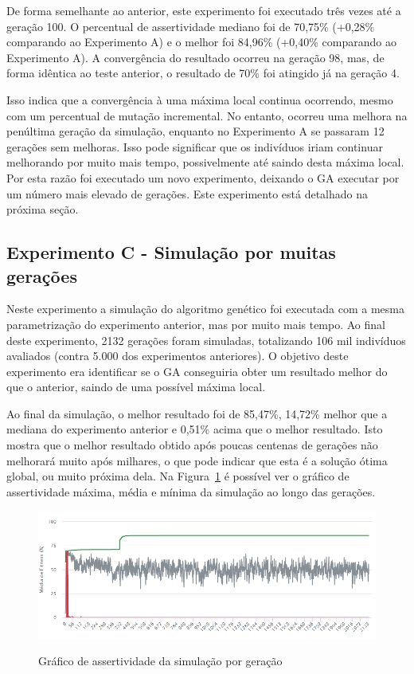 \documentclass[12pt,oneside,a4paper,english,french,spanish,brazil,]{abntex2}
\begin{document}
De forma semelhante ao anterior, este experimento foi executado três vezes até a geração 100. O percentual de assertividade mediano foi de 70,75\% (+0,28\% comparando ao Experimento A) e o melhor foi 84,96\% (+0,40\% comparando ao Experimento A). A convergência do resultado ocorreu na geração 98, mas, de forma idêntica ao teste anterior, o resultado de 70\% foi atingido já na geração 4. 

Isso indica que a convergência à uma máxima local continua ocorrendo, mesmo com um percentual de mutação incremental. No entanto, ocorreu uma melhora na penúltima geração da simulação, enquanto no Experimento A se passaram 12 gerações sem melhoras. Isso pode significar que os indivíduos iriam continuar melhorando por muito mais tempo, possivelmente até saindo desta máxima local. Por esta razão foi executado um novo experimento, deixando o GA executar por um número mais elevado de gerações. Este experimento está detalhado na próxima seção.


\subsection{Experimento C - Simulação por muitas gerações}

Neste experimento a simulação do algoritmo genético foi executada com a mesma parametrização do experimento anterior, mas por muito mais tempo. Ao final deste experimento, 2132 gerações foram simuladas, totalizando 106 mil indivíduos avaliados (contra 5.000 dos experimentos anteriores). O objetivo deste experimento era identificar se o GA conseguiria obter um resultado melhor do que o anterior, saindo de uma possível máxima local.

Ao final da simulação, o melhor resultado foi de 85,47\%, 14,72\% melhor que a mediana do experimento anterior e 0,51\% acima que o melhor resultado. Isto mostra que o melhor resultado obtido após poucas centenas de gerações não melhorará muito após milhares, o que pode indicar que esta é a solução ótima global, ou muito próxima dela. Na Figura~\ref{fig:DES_Grafico_Experimento_C} é possível ver o gráfico de assertividade máxima, média e mínima da simulação ao longo das gerações.


\begin{figure}[ht]
\centering
\caption{Gráfico de assertividade da simulação por geração}
\includegraphics[width=1.0\textwidth]{imagens/DES_Grafico_Experimento_C.PNG}
\sourceAuthor{}
\label{fig:DES_Grafico_Experimento_C}
\end{figure}
\end{document}
